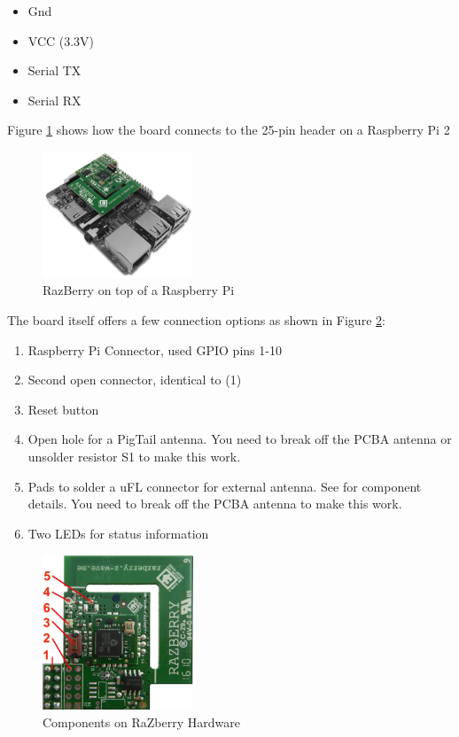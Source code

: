 \begin{itemize}
\item Gnd
\item VCC (3.3V)
\item Serial TX
\item Serial RX
\end{itemize}

Figure \ref{q1} shows how the board connects to the 25-pin header on a Raspberry Pi 2

\begin{figure}
\begin{center}
\includegraphics[width=0.4\textwidth]{pngs/cap2/q1.png}
\caption{RazBerry on top of a Raspberry Pi}
\label{q1}
\end{center}
\end{figure}

The board itself offers a few connection options as shown in Figure \ref{q2}:
\begin{enumerate}
\item Raspberry Pi Connector, used GPIO pins 1-10
\item Second open connector, identical to (1)
\item Reset button
\item Open hole for a PigTail antenna. You need to break off the PCBA antenna or unsolder 
resistor S1 to make this work.
\item Pads to solder a uFL connector for external antenna. See 
 for component details. You need to break 
off the PCBA antenna to make this work.
\item Two LEDs for status information
\end{enumerate}

\begin{figure}
\begin{center}
\includegraphics[width=0.4\textwidth]{pngs/cap2/q2.png}
\caption{Components on RaZberry Hardware}
\label{q2}
\end{center}
\end{figure}

